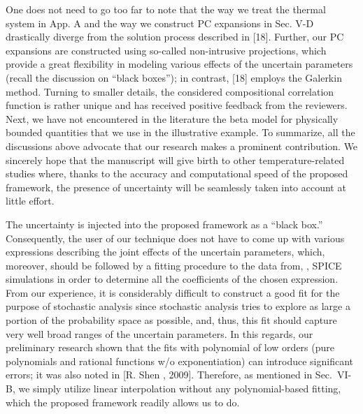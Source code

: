 \begin{authors}
One does not need to go too far to note that the way we treat the thermal system in App. A and the way we construct PC expansions in Sec. V-D drastically diverge from the solution process described in [18].
Further, our PC expansions are constructed using so-called non-intrusive projections, which provide a great flexibility in modeling various effects of the uncertain parameters (recall the discussion on ``black boxes''); in contrast, [18] employs the Galerkin method.
Turning to smaller details, the considered compositional correlation function is rather unique and has received positive feedback from the reviewers.
Next, we have not encountered in the literature the beta model for physically bounded quantities that we use in the illustrative example.
To summarize, all the discussions above advocate that our research makes a prominent contribution.
We sincerely hope that the manuscript will give birth to other temperature-related studies where, thanks to the accuracy and computational speed of the proposed framework, the presence of uncertainty will be seamlessly taken into account at little effort.

The uncertainty is injected into the proposed framework as a ``black box.''
Consequently, the user of our technique does not have to come up with various expressions describing the joint effects of the uncertain parameters, which, moreover, should be followed by a fitting procedure to the data from, \eg, SPICE simulations in order to determine all the coefficients of the chosen expression.
From our experience, it is considerably difficult to construct a good fit for the purpose of stochastic analysis since stochastic analysis tries to explore as large a portion of the probability space as possible, and, thus, this fit should capture very well broad ranges of the uncertain parameters.
In this regards, our preliminary research shown that the fits with polynomial of low orders (pure polynomials and rational functions w/o exponentiation) can introduce significant errors; it was also noted in [R. Shen \etal, 2009].
Therefore, as mentioned in Sec.~VI-B, we simply utilize linear interpolation without any polynomial-based fitting, which the proposed framework readily allows us to do.
\end{authors}

